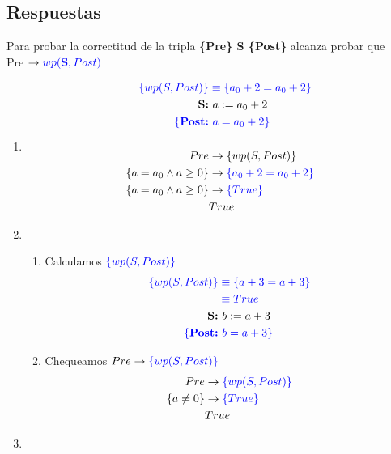 \documentclass{article}
\begin{document}
\subsection*{Respuestas}
Para probar la correctitud de la tripla \textbf{\{Pre\} S \{Post\}} alcanza probar que\\
\hspace*{40mm}Pre $\rightarrow \color{blue}wp(\textbf{S},Post)$
\begin{enumerate}[label=\alph*)]
	\item
		\begin{align*}
		\color{blue}\{wp(S,Post)\} &\color{blue}
			\equiv \{a_0+2=a_0+2\}\\
		\textbf{S:} &\  a := a_0 + 2\\
		\color{blue}\{\textbf{Post:} &\color{blue}\  a = a_0 + 2\}\\
		\\
		Pre &\rightarrow \{wp(S,Post)\}\\
		\{a = a_0 \wedge a \geq 0\}&\rightarrow \color{blue}\{a_0+2=a_0+2\}\\
		\{a = a_0 \wedge a \geq 0\}&\rightarrow \color{blue}\{True\}\\
		& True 
		\end{align*}
	\item
	\begin{enumerate}[label=\arabic*.]

	\item Calculamos $\color{blue}\{wp(S,Post)\}$
		\begin{align*}
		\color{blue}\{wp(S,Post)\}
			&\color{blue} \equiv \{a + 3 = a + 3\}\\
			&\color{blue} \equiv True\\	  	  
		\textbf{S:} &\  b := a + 3\\
		\color{blue}\{\textbf{Post:} &\color{blue}\  b = a + 3\}\\
		\end{align*}
	\item Chequeamos $Pre \rightarrow \color{blue}\{wp(S,Post)\}$		
		\begin{align*}
		Pre &\rightarrow \color{blue}\{wp(S,Post)\}\\
		\{a \neq 0\}&\rightarrow \color{blue}\{True\}\\
		& True 
		\end{align*}
	\end{enumerate}
	\item
	\begin{enumerate}[label=\arabic*.]


\end{enumerate}
\end{enumerate}
\end{document}
